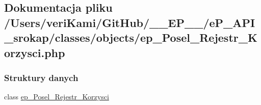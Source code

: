 \hypertarget{ep___posel___rejestr___korzysci_8php}{\subsection{Dokumentacja pliku /\-Users/veri\-Kami/\-Git\-Hub/\-\_\-\-\_\-\-E\-P\-\_\-\-\_\-/e\-P\-\_\-\-A\-P\-I\-\_\-srokap/classes/objects/ep\-\_\-\-Posel\-\_\-\-Rejestr\-\_\-\-Korzysci.php}
\label{ep___posel___rejestr___korzysci_8php}
}
\subsubsection*{Struktury danych}
\begin{DoxyCompactItemize}
\item 
class \hyperlink{classep___posel___rejestr___korzysci}{ep\-\_\-\-Posel\-\_\-\-Rejestr\-\_\-\-Korzysci}
\end{DoxyCompactItemize}
